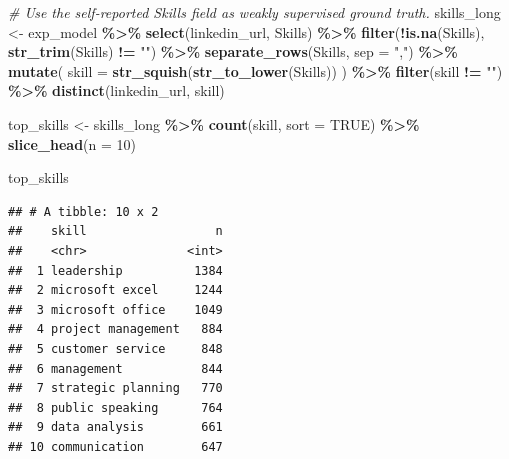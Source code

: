 \documentclass[
]{article}
\newenvironment{Shaded}{\begin{snugshade}}{\end{snugshade}}
\newcommand{\AttributeTok}[1]{\textcolor[rgb]{0.13,0.29,0.53}{#1}}
\newcommand{\CommentTok}[1]{\textcolor[rgb]{0.56,0.35,0.01}{\textit{#1}}}
\newcommand{\ConstantTok}[1]{\textcolor[rgb]{0.56,0.35,0.01}{#1}}
\newcommand{\DecValTok}[1]{\textcolor[rgb]{0.00,0.00,0.81}{#1}}
\newcommand{\FunctionTok}[1]{\textcolor[rgb]{0.13,0.29,0.53}{\textbf{#1}}}
\newcommand{\NormalTok}[1]{#1}
\newcommand{\OtherTok}[1]{\textcolor[rgb]{0.56,0.35,0.01}{#1}}
\newcommand{\SpecialCharTok}[1]{\textcolor[rgb]{0.81,0.36,0.00}{\textbf{#1}}}
\newcommand{\StringTok}[1]{\textcolor[rgb]{0.31,0.60,0.02}{#1}}
\begin{document}
\begin{Shaded}
\begin{Highlighting}[]
\CommentTok{\# Use the self{-}reported Skills field as weakly supervised ground truth.}
\NormalTok{skills\_long }\OtherTok{\textless{}{-}}\NormalTok{ exp\_model }\SpecialCharTok{\%\textgreater{}\%}
  \FunctionTok{select}\NormalTok{(linkedin\_url, Skills) }\SpecialCharTok{\%\textgreater{}\%}
  \FunctionTok{filter}\NormalTok{(}\SpecialCharTok{!}\FunctionTok{is.na}\NormalTok{(Skills), }\FunctionTok{str\_trim}\NormalTok{(Skills) }\SpecialCharTok{!=} \StringTok{""}\NormalTok{) }\SpecialCharTok{\%\textgreater{}\%}
  \FunctionTok{separate\_rows}\NormalTok{(Skills, }\AttributeTok{sep =} \StringTok{","}\NormalTok{) }\SpecialCharTok{\%\textgreater{}\%}
  \FunctionTok{mutate}\NormalTok{(}
    \AttributeTok{skill =} \FunctionTok{str\_squish}\NormalTok{(}\FunctionTok{str\_to\_lower}\NormalTok{(Skills))}
\NormalTok{  ) }\SpecialCharTok{\%\textgreater{}\%}
  \FunctionTok{filter}\NormalTok{(skill }\SpecialCharTok{!=} \StringTok{""}\NormalTok{) }\SpecialCharTok{\%\textgreater{}\%}
  \FunctionTok{distinct}\NormalTok{(linkedin\_url, skill)}

\NormalTok{top\_skills }\OtherTok{\textless{}{-}}\NormalTok{ skills\_long }\SpecialCharTok{\%\textgreater{}\%}
  \FunctionTok{count}\NormalTok{(skill, }\AttributeTok{sort =} \ConstantTok{TRUE}\NormalTok{) }\SpecialCharTok{\%\textgreater{}\%}
  \FunctionTok{slice\_head}\NormalTok{(}\AttributeTok{n =} \DecValTok{10}\NormalTok{)}

\NormalTok{top\_skills}
\end{Highlighting}
\end{Shaded}

\begin{verbatim}
## # A tibble: 10 x 2
##    skill                  n
##    <chr>              <int>
##  1 leadership          1384
##  2 microsoft excel     1244
##  3 microsoft office    1049
##  4 project management   884
##  5 customer service     848
##  6 management           844
##  7 strategic planning   770
##  8 public speaking      764
##  9 data analysis        661
## 10 communication        647
\end{verbatim}
\end{document}
